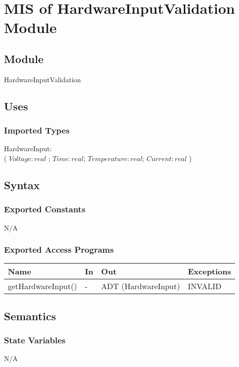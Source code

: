 \documentclass[12pt, titlepage]{article}
\begin{document}
\section{MIS of HardwareInputValidation Module} \label{Module}
\subsection{Module}

HardwareInputValidation

\subsection{Uses}

\subsubsection{Imported Types}
HardwareInput: \\
( $Voltage: real $ ; $Time: real$; $Temperature: real$; $Current: real$ )

\subsection{Syntax}

\subsubsection{Exported Constants}
N/A

\subsubsection{Exported Access Programs}

\begin{center}
\begin{tabular}{p{4cm} p{2cm} p{6cm} p{2cm}}
\hline
\textbf{Name} & \textbf{In} & \textbf{Out} & \textbf{Exceptions} \\
\hline
getHardwareInput() & - & ADT (HardwareInput) & INVALID \\
\hline
\end{tabular}
\end{center}

\subsection{Semantics}

\subsubsection{State Variables}
N/A
\end{document}
